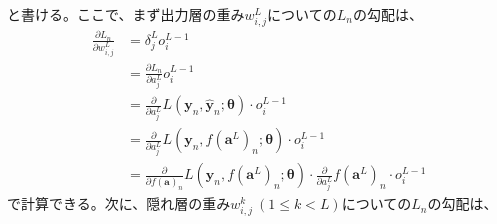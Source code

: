 \documentclass[12pt]{jarticle}
\numberwithin{equation}{section}    %
\numberwithin{figure}{section}      %
\numberwithin{table}{section}      %
\begin{document}
と書ける。ここで、まず出力層の重み$w_{i, j}^{L}$についての$L_{n}$の勾配は、
\begin{align}
    \frac{\partial L_{n}}{\partial w_{i, j}^{L}} & = \delta_{j}^{L} o_{i}^{L - 1}                                                                                                                                          \\
                                                 & = \frac{\partial L_{n}}{\partial a_{j}^{L}} o_{i}^{L - 1}                                                                                                               \\
                                                 & = \frac{\partial}{\partial a_{j}^{L}} L(\bm{y}_{n}, \hat{\bm{y}}_{n}; \bm{\theta}) \cdot o_{i}^{L - 1}                                                                  \\
                                                 & = \frac{\partial}{\partial a_{j}^{L}} L(\bm{y}_{n}, f(\bm{a}^{L})_{n}; \bm{\theta}) \cdot o_{i}^{L - 1}                                                                 \\
                                                 & = \frac{\partial}{\partial f(\bm{a})_{n}} L(\bm{y}_{n}, f(\bm{a}^{L})_{n}; \bm{\theta}) \cdot \frac{\partial}{\partial a_{j}^{L}} f(\bm{a}^{L})_{n} \cdot o_{i}^{L - 1}
\end{align}
で計算できる。次に、隠れ層の重み$w_{i, j}^{k} ~ (1 \le k < L)$についての$L_{n}$の勾配は、
\end{document}
